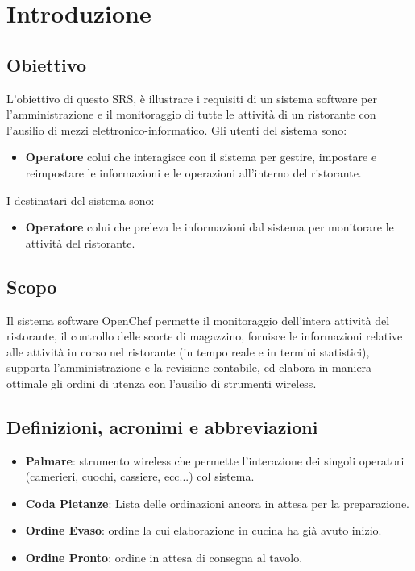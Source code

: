 \chapter{Introduzione}
\section{Obiettivo}
    L'obiettivo di questo SRS, \`e illustrare i requisiti di un sistema 
    software per l'amministrazione e il monitoraggio di tutte le attivit\`a 
    di un ristorante con l'ausilio di mezzi elettronico-informatico.
    Gli utenti del sistema sono:
    \begin{itemize}
        \item {\bf Operatore} colui che interagisce con il sistema per gestire, 
            impostare e reimpostare  le informazioni e le operazioni 
            all'interno del ristorante.
    \end{itemize}
    I  destinatari del sistema sono:
    \begin{itemize}
        \item {\bf Operatore} colui che preleva le informazioni dal sistema per 
            monitorare le attivit\`a del ristorante.
    \end{itemize}
    
\section{Scopo}
    Il sistema software OpenChef permette il monitoraggio dell'intera attivit\`a 
    del ristorante, il controllo delle scorte di magazzino, fornisce le informazioni 
    relative alle attivit\`a in corso nel ristorante (in tempo reale e in termini 
    statistici), supporta l'amministrazione e la revisione contabile, ed elabora 
    in maniera ottimale gli ordini di utenza con l'ausilio di strumenti wireless. 

\section{Definizioni, acronimi e abbreviazioni}
    \begin{itemize}
        \item {\bf Palmare}: strumento wireless che permette l'interazione dei 
            singoli operatori (camerieri, cuochi, cassiere, ecc...) col sistema.
        \item {\bf Coda Pietanze}: Lista delle ordinazioni ancora in attesa 
            per la preparazione.
        \item {\bf Ordine Evaso}: ordine la cui elaborazione in cucina ha gi\`a 
            avuto inizio.
        \item {\bf Ordine Pronto}: ordine in attesa di consegna al tavolo.
    \end{itemize}

